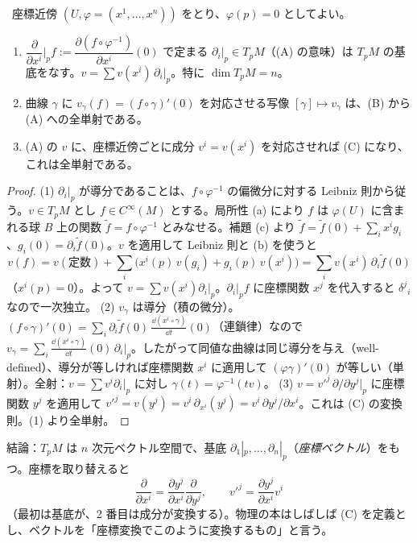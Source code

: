 \begin{thm}[3 つの定義の同値]\label{A:thm:tangent}
\tP\ 座標近傍 $(U,\varphi=(x^1,\dots,x^n))$ をとり、$\varphi(p)=0$ としてよい。
\begin{enumerate}
\item $\dfrac{\partial}{\partial x^i}\Big|_p f:=\dfrac{\partial(f\circ\varphi^{-1})}{\partial x^i}(0)$ で定まる $\partial_i|_p\in T_pM$（(A) の意味）は $T_pM$ の基底をなす。\allowbreak\mbox{$v=\sum v(x^i)\,\partial_i|_p$}。特に $\dim T_pM=n$。
\item 曲線 $\gamma$ に $v_\gamma(f)=(f\circ\gamma)'(0)$ を対応させる写像 $[\gamma]\mapsto v_\gamma$ は、(B) から (A) への全単射である。
\item (A) の $v$ に、座標近傍ごとに成分 $v^i=v(x^i)$ を対応させれば (C) になり、これは全単射である。
\end{enumerate}
\end{thm}
\begin{proof}
(1) $\partial_i|_p$ が導分であることは、$f\circ\varphi^{-1}$ の偏微分に対する Leibniz 則から従う。$v\in T_pM$ とし $f\in C^\infty(M)$ とする。局所性 (a) により $f$ は $\varphi(U)$ に含まれる球 $B$ 上の関数 $\tilde f=f\circ\varphi^{-1}$ とみなせる。補題 (c) より $\tilde f=\tilde f(0)+\sum_ix^ig_i$、$g_i(0)=\partial_i\tilde f(0)$。$v$ を適用して Leibniz 則と (b) を使うと
\[
v(f)=v(\text{定数})+\sum_i\bigl(x^i(p)\,v(g_i)+g_i(p)\,v(x^i)\bigr)=\sum_iv(x^i)\,\partial_i\tilde f(0)
\]
（$x^i(p)=0$）。よって $v=\sum v(x^i)\partial_i|_p$。$\partial_i|_pf$ に座標関数 $x^j$ を代入すると $\delta^j{}_i$ なので一次独立。
(2) $v_\gamma$ は導分（積の微分）。$(f\circ\gamma)'(0)=\sum_i\partial_i\tilde f(0)\,\frac{\dd(x^i\circ\gamma)}{\dd t}(0)$（連鎖律）なので $v_\gamma=\sum_i\frac{\dd(x^i\circ\gamma)}{\dd t}(0)\,\partial_i|_p$。したがって同値な曲線は同じ導分を与え（well-defined）、導分が等しければ座標関数 $x^i$ に適用して $(\varphi\gamma)'(0)$ が等しい（単射）。全射：$v=\sum v^i\partial_i|_p$ に対し $\gamma(t)=\varphi^{-1}(tv)$。
(3) $v=v'^j\,\partial/\partial y^j|_p$ に座標関数 $y^j$ を適用して $v'^j=v(y^j)=v^i\,\partial_{x^i}(y^j)=v^i\,\partial y^j/\partial x^i$。これは (C) の変換則。(1) より全単射。
\end{proof}

結論：$T_pM$ は $n$ 次元ベクトル空間で、基底 $\partial_1|_p,\dots,\partial_n|_p$（\emph{座標ベクトル}）をもつ。座標を取り替えると
\begin{equation}\label{A:eq:coordvec}
\frac{\partial}{\partial x^i}=\frac{\partial y^j}{\partial x^i}\frac{\partial}{\partial y^j},\qquad v'^j=\frac{\partial y^j}{\partial x^i}v^i
\end{equation}
（最初は基底が、2 番目は成分が変換する）。物理の本はしばしば (C) を定義とし、ベクトルを「座標変換でこのように変換するもの」と言う。

